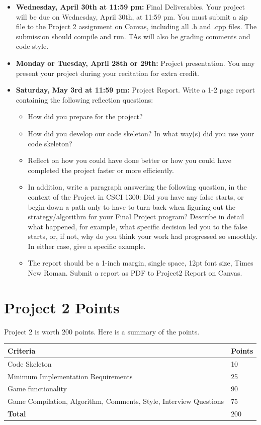 \begin{itemize}
    \item \textbf{Wednesday, April 30th at 11:59 pm:} Final Deliverables. Your project will be due on Wednesday, April 30th, at 11:59 pm. You must submit a zip file to the Project 2 assignment on Canvas, including all .h and .cpp files. The submission should compile and run. TAs will also be grading comments and code style.
    \item \textbf{Monday or Tuesday, April 28th or 29th: } Project presentation. You may present your project during your recitation for extra credit.%
    \item \textbf{Saturday, May 3rd at 11:59 pm:} Project Report. Write a 1-2 page report containing the following reflection questions:
    \begin{itemize}
        \item How did you prepare for the project?
        \item How did you develop our code skeleton? In what way(s) did you use your code skeleton?
        \item Reflect on how you could have done better or how you could have completed the project faster or more efficiently.
        \item In addition, write a paragraph answering the following question, in the context of the Project in CSCI 1300: Did you have any false starts, or begin down a path only to have to turn back when figuring out the strategy/algorithm for your Final Project program? Describe in detail what happened, for example, what specific decision led you to the false starts, or, if not, why do you think your work had progressed so smoothly. In either case, give a specific example.
        \item The report should be a 1-inch margin, single space, 12pt font size, Times New Roman. Submit a report as PDF to Project2 Report on Canvas.
    \end{itemize}
\end{itemize}
 
\section{Project 2 Points}
Project 2 is worth 200 points. Here is a summary of the points.

\begin{table}[H]
\centering

\begin{tabular}{|l |l|} \hline 
\textbf{Criteria}& \textbf{Points}\\ \hline 

Code Skeleton & 10 \\ \hline 
Minimum Implementation Requirements & 25\\ \hline 
Game functionality & 90\\ \hline 
Game Compilation, Algorithm, Comments, Style, Interview Questions & 75 \\ \hline 
\textbf{Total}& 200\\ \hline

\end{tabular}

\end{table}

